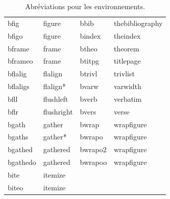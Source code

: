 \documentclass[11pt,french]{article}
\begin{document}
\begin{table}[H]
\begin{tabular}{llll}
bfig      & figure      & bbib    & thebibliography \\
bfigo     & figure      & bindex  & theindex \\
bframe    & frame       & btheo   & theorem \\
bframeo   & frame       & btitpg  & titlepage \\
bflalig   & flalign     & btrivl  & trivlist \\
bflaligs  & flalign*    & bvarw   & varwidth \\
bfll      & flushleft   & bverb   & verbatim \\
bflr      & flushright  & bvers   & verse \\
bgath     & gather      & bwrap   & wrapfigure \\
bgaths    & gather*     & bwrapo  & wrapfigure \\
bgathed   & gathered    & bwrapo2 & wrapfigure \\
bgathedo  & gathered    & bwrapoo & wrapfigure \\
bite      & itemize     &         & \\
biteo     & itemize     &         & \\
\end{tabular}
\caption{Abréviations pour les environnements.}
\label{tblenvironments}
\end{table}
\end{document}
